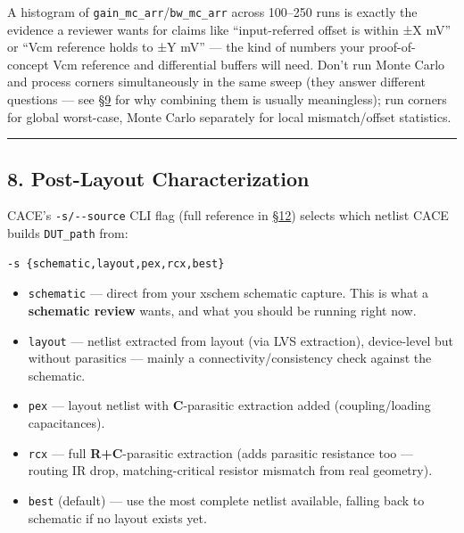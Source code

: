 \documentclass[
]{article}
\providecommand{\tightlist}{%
  \setlength{\itemsep}{0pt}\setlength{\parskip}{0pt}}
\begin{document}
A histogram of \texttt{gain\_mc\_arr}/\texttt{bw\_mc\_arr} across
100--250 runs is exactly the evidence a reviewer wants for claims like
``input-referred offset is within ±X mV'' or ``Vcm reference holds to ±Y
mV'' --- the kind of numbers your proof-of-concept Vcm reference and
differential buffers will need. Don't run Monte Carlo and process
corners simultaneously in the same sweep (they answer different
questions --- see
\protect\hyperlink{9-per-pdk-adaptation-sg13g2cmos5l-gf180mcu-sky130}{§9}
for why combining them is usually meaningless); run corners for global
worst-case, Monte Carlo separately for local mismatch/offset statistics.

\begin{center}\rule{0.5\linewidth}{0.5pt}\end{center}

\hypertarget{post-layout-characterization}{%
\subsection{8. Post-Layout
Characterization}\label{post-layout-characterization}}

CACE's \texttt{-s/-\/-source} CLI flag (full reference in
\protect\hyperlink{12-appendix-command-cheat-sheet-and-blank-datasheet-skeleton}{§12})
selects which netlist CACE builds \texttt{DUT\_path} from:

\begin{verbatim}
-s {schematic,layout,pex,rcx,best}
\end{verbatim}

\begin{itemize}
\tightlist
\item
  \texttt{schematic} --- direct from your xschem schematic capture. This
  is what a \textbf{schematic review} wants, and what you should be
  running right now.
\item
  \texttt{layout} --- netlist extracted from layout (via LVS
  extraction), device-level but without parasitics --- mainly a
  connectivity/consistency check against the schematic.
\item
  \texttt{pex} --- layout netlist with \textbf{C}-parasitic extraction
  added (coupling/loading capacitances).
\item
  \texttt{rcx} --- full \textbf{R+C}-parasitic extraction (adds
  parasitic resistance too --- routing IR drop, matching-critical
  resistor mismatch from real geometry).
\item
  \texttt{best} (default) --- use the most complete netlist available,
  falling back to schematic if no layout exists yet.
\end{itemize}
\end{document}
